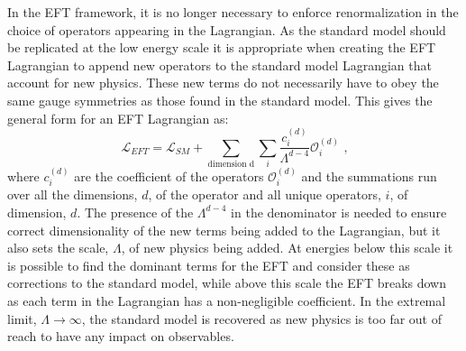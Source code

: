 In the EFT framework, it is no longer necessary to enforce renormalization in the choice of operators appearing in the Lagrangian.  As the standard model should be replicated at the low energy scale it is appropriate when creating the EFT Lagrangian to append new operators to the standard model Lagrangian that account for new physics.  These new terms do not necessarily have to obey the same gauge symmetries as those found in the standard model.  This gives the general form for an EFT Lagrangian as:
%
\begin{equation}
\mathcal{L}_{EFT} = \mathcal{L}_{SM} + \sum_{\text{dimension d}} \sum_{i} \frac{c_{i}^{(d)}}{\Lambda^{d-4}} \mathcal{O}_{i}^{(d)} \text{ ,}
\end{equation}
%
\noindent where $c_{i}^{(d)}$ are the coefficient of the operators $\mathcal{O}_{i}^{(d)}$ and the summations run over all the dimensions, $d$, of the operator and all unique operators, $i$, of dimension, $d$.  The presence of the $\Lambda^{d-4}$ in the denominator is needed to ensure correct dimensionality of the new terms being added to the Lagrangian, but it also sets the scale, $\Lambda$, of new physics being added.  At energies below this scale it is possible to find the dominant terms for the EFT and consider these as corrections to the standard model, while above this scale the EFT breaks down as each term in the Lagrangian has a non-negligible coefficient.  In the extremal limit, $\Lambda \rightarrow \infty$, the standard model is recovered as new physics is too far out of reach to have any impact on observables.


